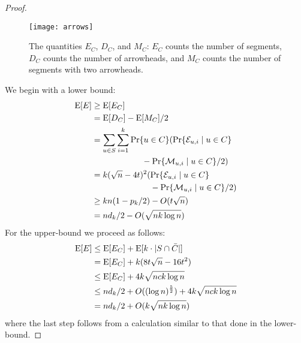 \documentclass[twoside,leqno,twocolumn]{article}
\begin{document}
\begin{proof}
  \begin{figure}
    \begin{center}
      \texttt{[image: arrows]}
    \end{center}
    \caption{The quantities $E_C$, $D_C$, and $M_C$: $E_C$ counts the
      number of segments,  $D_C$ counts the number of arrowheads, and $M_C$
      counts the number of segments with two arrowheads.}
  \end{figure}
  We begin with a lower bound:
  \begin{align*}
   \mathrm{E}[E] & \ge \mathrm{E}[E_C] \\
         & = \mathrm{E}[D_C] - \mathrm{E}[M_C]/2 \\
         & = \sum_{u\in S}\sum_{i=1}^k\Pr\{u\in C\}
              (\Pr\{\mathcal{E}_{u,i}\mid u\in C\} \\
                & \qquad\qquad\qquad - \Pr\{\mathcal{M}_{u,i}\mid u\in C\}/2 ) \\
        & = k(\sqrt{n}-4t)^2
              (\Pr\{\mathcal{E}_{u,i}\mid u\in C\} \\
                & \qquad\qquad\qquad\quad - \Pr\{\mathcal{M}_{u,i}\mid u\in C\}/2 ) \\
        & \ge kn(1-p_k/2) - O(t\sqrt{n}) \\
        & = nd_k/2 - O(\sqrt{nk\log n})
  \end{align*} 
  For the upper-bound we proceed as follows:
  \begin{align*}
     \mathrm{E}[E] & \le \mathrm{E}[E_C] + \mathrm{E}[k\cdot|S\cap\bar{C}|] \\
           & = \mathrm{E}[E_C] + k(8t\sqrt{n}-16t^2) \\
           & \le \mathrm{E}[E_C] + 4k\sqrt{nck\log n} \\
           & \le nd_k/2 + O((\log n)^\frac52) + 4k\sqrt{nck\log n} \\
           & = nd_k/2 + O(k\sqrt{nk\log n})
  \end{align*}
  where the last step follows from a calculation similar to that
  done in the lower-bound.
%
%
%
\end{proof}
\end{document}
